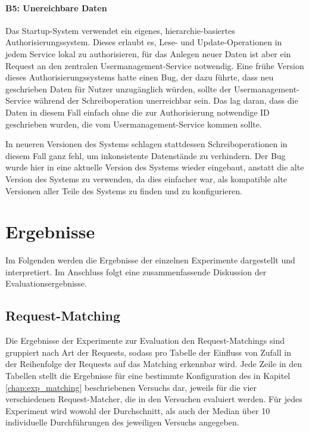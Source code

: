 \documentclass[12pt,a4paper]{report}
\begin{document}
\subsubsection{B5: Unereichbare Daten}
Das Startup-System verwendet ein eigenes, hierarchie-basiertes Authorisierungssystem. Dieses erlaubt es, Lese- und
Update-Operationen in jedem Service lokal zu authorisieren, für das Anlegen neuer Daten ist aber ein Request an den zentralen
Usermanagement-Service notwendig. Eine frühe Version dieses Authorisierungssystems hatte einen Bug, der dazu führte, dass neu
geschrieben Daten für Nutzer unzugänglich würden, sollte der Usermanagement-Service während der Schreiboperation unerreichbar
sein. Das lag daran, dass die Daten in diesem Fall einfach ohne die zur Authorisierung notwendige ID geschrieben wurden, die vom
Usermanagement-Service kommen sollte.

In neueren Versionen des Systems schlagen stattdessen Schreiboperationen in diesem Fall ganz fehl, um inkonsistente Datenstände zu
verhindern. Der Bug wurde hier in eine aktuelle Version des Systems wieder eingebaut, anstatt die alte Version des Systems zu
verwenden, da dies einfacher war, als kompatible alte Versionen aller Teile des Systems zu finden und zu konfigurieren.



\chapter{Ergebnisse}
\label{chap:results}
Im Folgenden werden die Ergebnisse der einzelnen Experimente dargestellt und interpretiert. Im Anschluss folgt eine
zusammenfassende Diskussion der Evaluationsergebnisse.

\section{Request-Matching}
Die Ergebnisse der Experimente zur Evaluation den Request-Matchings sind gruppiert nach Art der Requests, sodass pro Tabelle
der Einfluss von Zufall in der Reihenfolge der Requests auf das Matching erkennbar wird.
Jede Zeile in den Tabellen stellt die Ergebnisse für eine bestimmte Konfiguration des in Kapitel \ref{chap:exp_matching}
beschriebenen Versuchs dar, jeweils für die vier verschiedenen Request-Matcher, die in den Versuchen evaluiert werden. Für jedes Experiment
wird wowohl der Durchschnitt, als auch der Median über 10 individuelle Durchführungen des jeweiligen Versuchs angegeben.
\end{document}
